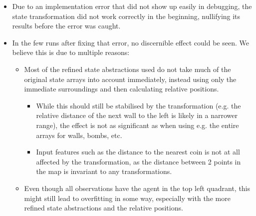 \documentclass{article} %
\begin{document}
	\begin{itemize}
		\item Due to an implementation error that did not show up easily in debugging, the state transformation did not work correctly in the beginning, nullifying its results before the error was caught.
		\item In the few runs after fixing that error, no discernible effect could be seen. We believe this is due to multiple reasons:
		\begin{itemize}
			\item Most of the refined state abstractions used do not take much of the original state arrays into account immediately, instead using only the immediate surroundings and then calculating relative positions.
			\begin{itemize}
				\item While this should still be stabilised by the transformation (e.g. the relative distance of the next wall to the left is likely in a narrower range), the effect is not as significant as when using e.g. the entire arrays for walls, bombs, etc.
				\item Input features such as the distance to the nearest coin is not at all affected by the transformation, as the distance between 2 points in the map is invariant to any transformations.
			\end{itemize}
			\item Even though all observations have the agent in the top left quadrant, this might still lead to overfitting in some way, especially with the more refined state abstractions and the relative positions.
		\end{itemize}
	\end{itemize}
	
\end{document}
